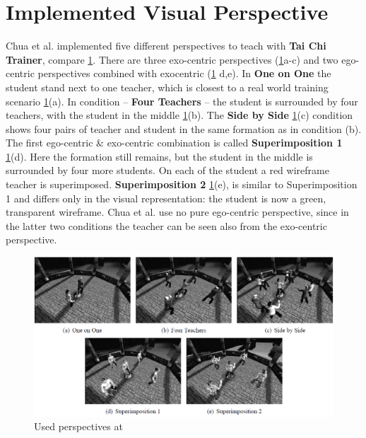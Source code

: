 \section{Implemented Visual Perspective}
Chua et al. \cite{Chua2003} implemented five different perspectives to teach with \textbf{Tai Chi Trainer}, compare \ref{fig:taichiperspectives}. There are three exo-centric perspectives (\ref{fig:taichiperspectives}a-c) and two ego-centric perspectives combined with exocentric (\ref{fig:taichiperspectives} d,e). In \textbf{One on One} the student stand next to one teacher, which is closest to a real world training scenario \ref{fig:taichiperspectives}(a). In condition \--- \textbf{Four Teachers} \--- the student is surrounded by four teachers, with the student in the middle \ref{fig:taichiperspectives}(b). The \textbf{Side by Side} \ref{fig:taichiperspectives}(c) condition shows four pairs of teacher and student in the same formation as in condition (b). The first ego-centric \& exo-centric combination is called \textbf{Superimposition 1} \ref{fig:taichiperspectives}(d). Here the formation still remains, but the student in the middle is surrounded by four more students. On each of the student a red wireframe teacher is superimposed. \textbf{Superimposition 2} \ref{fig:taichiperspectives}(e), is similar to Superimposition 1 and differs only in the visual representation: the student is now a green, transparent wireframe. Chua et al. use no pure ego-centric perspective, since in the latter two conditions the teacher can be seen also from the exo-centric perspective.
\begin{figure}
	\centering
	\includegraphics[width=1.0\textwidth]{img/taichi_perspectives.png}
	\caption{Used perspectives at \cite{Chua2003}}
	\label{fig:taichiperspectives}
\end{figure}\\
